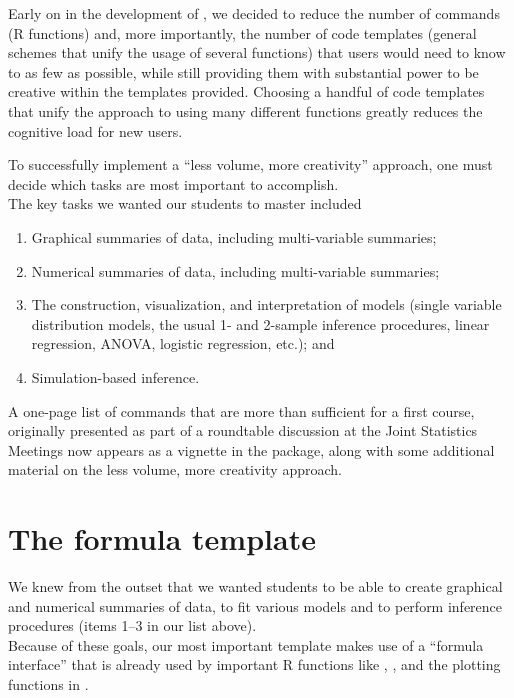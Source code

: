 Early on in the development of , we decided to reduce the
number of commands (R functions) and, more importantly, the number of
code templates (general schemes that unify the usage of several
functions) that users would need to know to as few as possible, while
still providing them with substantial power to be creative within the
templates provided. Choosing a handful of code templates that unify the
approach to using many different functions greatly reduces the cognitive
load for new users.

To successfully implement a ``less volume, more creativity'' approach,
one must decide which tasks are most important to accomplish.\\
The key tasks we wanted our students to master included

\begin{enumerate}
\def\labelenumi{\arabic{enumi}.}
\tightlist
\item
  Graphical summaries of data, including multi-variable summaries;
\item
  Numerical summaries of data, including multi-variable summaries;
\item
  The construction, visualization, and interpretation of models (single
  variable distribution models, the usual 1- and 2-sample inference
  procedures, linear regression, ANOVA, logistic regression, etc.); and
\item
  Simulation-based inference.
\end{enumerate}

A one-page list of commands that are more than sufficient for a first
course, originally presented as part of a roundtable discussion at the
Joint Statistics Meetings \citep{Pruim:MinimalR:2011} now appears as a
vignette in the package, along with some additional material on the less
volume, more creativity approach.

\section{The formula template}\label{the-formula-template}

We knew from the outset that we wanted students to be able to create
graphical and numerical summaries of data, to fit various models and to
perform inference procedures (items 1--3 in our list above).\\
Because of these goals, our most important template makes use of a
``formula interface'' that is already used by important R functions like
, , and the plotting functions in
 \citep{lattice}.

